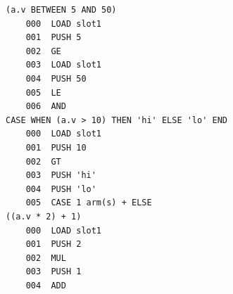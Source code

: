 \begin{lstlisting}[]
(a.v BETWEEN 5 AND 50)
    000  LOAD slot1
    001  PUSH 5
    002  GE
    003  LOAD slot1
    004  PUSH 50
    005  LE
    006  AND
CASE WHEN (a.v > 10) THEN 'hi' ELSE 'lo' END
    000  LOAD slot1
    001  PUSH 10
    002  GT
    003  PUSH 'hi'
    004  PUSH 'lo'
    005  CASE 1 arm(s) + ELSE
((a.v * 2) + 1)
    000  LOAD slot1
    001  PUSH 2
    002  MUL
    003  PUSH 1
    004  ADD
\end{lstlisting}
